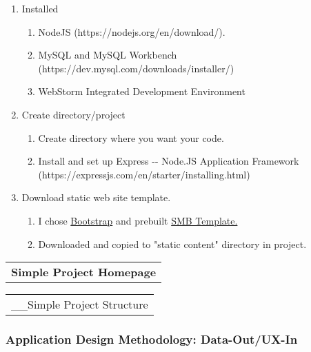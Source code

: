 \documentclass[11pt]{article}
\providecommand{\tightlist}{%
      \setlength{\itemsep}{0pt}\setlength{\parskip}{0pt}}
\begin{document}
\begin{enumerate}
\def\labelenumi{\arabic{enumi}.}
\tightlist
\item
  Installed

  \begin{enumerate}
  \def\labelenumii{\arabic{enumii}.}
  \tightlist
  \item
    NodeJS (https://nodejs.org/en/download/).
  \item
    MySQL and MySQL Workbench
    (https://dev.mysql.com/downloads/installer/)
  \item
    WebStorm Integrated Development Environment 
  \end{enumerate}
\item
  Create directory/project

  \begin{enumerate}
  \def\labelenumii{\arabic{enumii}.}
  \tightlist
  \item
    Create directory where you want your code.
  \item
    Install and set up Express -\/- Node.JS Application Framework
    (https://expressjs.com/en/starter/installing.html) 
  \end{enumerate}
\item
  Download static web site template.

  \begin{enumerate}
  \def\labelenumii{\arabic{enumii}.}
  \tightlist
  \item
    I chose
    \href{https://blackrockdigital.github.io/startbootstrap-small-business/}{Bootstrap}
    and prebuilt
    \href{https://blackrockdigital.github.io/startbootstrap-small-business/}{SMB
    Template.}
  \item
    Downloaded and copied to "static content" directory in project.
  \end{enumerate}
\end{enumerate}

    \begin{longtable}[]{@{}c@{}}
\toprule
\tabularnewline
\midrule
\endhead
\textbf{Simple Project Homepage}\tabularnewline
\bottomrule
\end{longtable}

\begin{longtable}[]{@{}c@{}}
\toprule
\tabularnewline
\midrule
\endhead
\_\_Simple Project Structure\tabularnewline
\bottomrule
\end{longtable}

    \subsubsection{Application Design Methodology:
Data-Out/UX-In}\label{application-design-methodology-data-outux-in}
\end{document}
